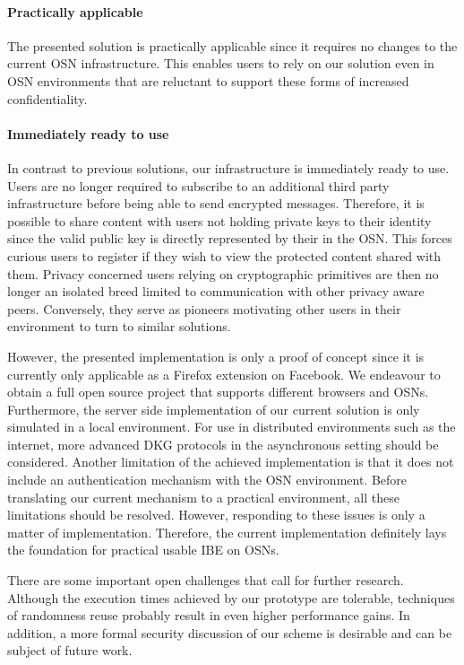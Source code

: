 \paragraph{Practically applicable} The presented solution is practically applicable since it requires no changes to the current OSN infrastructure. This enables users to rely on our solution even in OSN environments that are reluctant to support these forms of increased confidentiality.

\paragraph{Immediately ready to use} In contrast to previous solutions, our infrastructure is immediately ready to use. Users are no longer required to subscribe to an additional third party infrastructure before being able to send encrypted messages. Therefore, it is possible to share content with users not holding private keys to their identity since the valid public key is directly represented by their \id{} in the OSN. This forces curious users to register if they wish to view the protected content shared with them. Privacy concerned users relying on cryptographic primitives are then no longer an isolated breed limited to communication with other privacy aware peers. Conversely, they serve as pioneers motivating other users in their environment to turn to similar solutions.

However, the presented implementation is only a proof of concept since it is currently only applicable as a Firefox extension on Facebook. We endeavour to obtain a full open source project that supports different browsers and OSNs. Furthermore, the server side implementation of our current solution is only simulated in a local environment. For use in distributed environments such as the internet, more advanced DKG protocols in the asynchronous setting should be considered. Another limitation of the achieved implementation is that it does not include an authentication mechanism with the OSN environment. Before translating our current mechanism to a practical environment, all these limitations should be resolved. However, responding to these issues is only a matter of implementation. Therefore, the current implementation definitely lays the foundation for practical usable IBE on OSNs. 

There are some important open challenges that call for further research. Although the execution times achieved by our prototype are tolerable, techniques of randomness reuse probably result in even higher performance gains. In addition, a more formal security discussion of our scheme is desirable and can be subject of future work.

